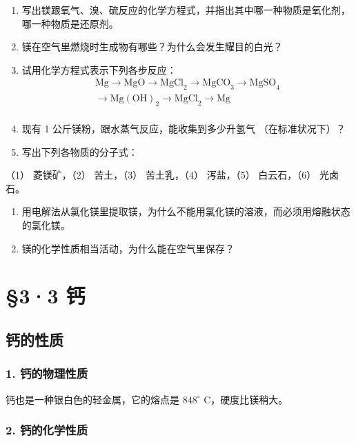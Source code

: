 \begin{enumerate}
\item
  写出镁跟氧气、溴、硫反应的化学方程式，并指出其中哪一种物质是氧化剂，哪一种物质是还原剂。
\item
  镁在空气里燃烧时生成物有哪些？为什么会发生耀目的白光？
\item
  试用化学方程式表示下列各步反应：
\[
\begin{array}{l} \mathrm{Mg} \longrightarrow \mathrm{MgO} \longrightarrow \mathrm{MgCl} _ {2} \longrightarrow \mathrm{MgCO} _ {3} \longrightarrow \mathrm{MgSO} _ {4} \\ \longrightarrow \mathrm{Mg} (\mathrm{OH}) _ {2} \longrightarrow \mathrm{MgCl} _ {2} \longrightarrow \mathrm{Mg} \\ \end{array}
\]
\item
  现有 1 公斤镁粉，跟水蒸气反应，能收集到多少升氢气 （在标准状况下）？
\item
  写出下列各物质的分子式：
\end{enumerate}

（1） 菱镁矿，（2） 苦土，（3） 苦土乳，（4） 泻盐，（5） 白云石，（6）
光卤石。

\begin{enumerate}[start=6]
\item
  用电解法从氯化镁里提取镁，为什么不能用氯化镁的溶液，而必须用熔融状态的氯化镁。
\item
  镁的化学性质相当活动，为什么能在空气里保存？
\end{enumerate}

\section{§3·3 钙}

\subsection{钙的性质}

\subsubsection{1. 钙的物理性质}

钙也是一种银白色的轻金属，它的熔点是 \(848^{\circ}\) C，硬度比镁稍大。

\subsubsection{2. 钙的化学性质}

